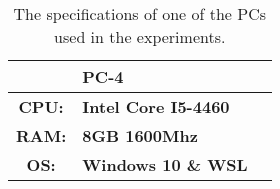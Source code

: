 \begin{table}[htb!]
    \centering
    \begin{tabular}{cp{}p{}}
        \toprule
        \textbf{}     & \textbf{PC-4}               \\
        \midrule
        \textbf{CPU:} & \textbf{Intel Core I5-4460} \\
        \textbf{RAM:} & \textbf{8GB 1600Mhz}        \\
        \textbf{OS:}  & \textbf{Windows 10 \& WSL}  \\
        \bottomrule
    \end{tabular}
    \caption{The specifications of one of the PCs used in the experiments.}
    \label{tab:pc4-specs}
\end{table}

\begin{table}
    \centering
    \begin{tabular}
        \toprule

        \midrule

        \bottomrule
    \end{tabular}
\end{table}